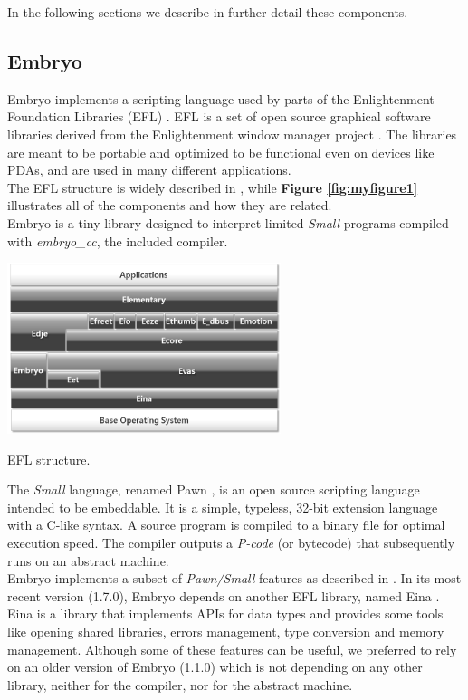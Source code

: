 \documentclass[a4paper,10pt]{article}
\makeatletter
\newenvironment{figurehere}{\def\@captype{figure}\vspace{2ex}}{\vspace{2ex}}
\makeatother
\begin{document}
\begin{multicols}{2}
In the following sections we describe in further detail these components.


\subsection{Embryo}

Embryo implements a scripting language used by parts of the Enlightenment Foundation Libraries (EFL) \cite{wikiEFL}. EFL is a set of open source graphical software libraries derived from the Enlightenment window manager project \cite{wikiEnlight}. The libraries are meant to be portable and optimized to be functional even on devices like PDAs, and are used in many different applications.\\
The EFL structure is widely described in \cite{enlightSite}, while {\bf Figure \ref{fig:myfigure1}} illustrates all of the components and how they are related.\\
Embryo \cite{embryoSite} is a tiny library designed to interpret limited \textit{Small} programs compiled with \textit{embryo\_cc}, the included compiler.

\begin{figurehere}
 \centering
 \includegraphics[width=8cm, height=5cm]{./eps/efl}
 \caption{EFL structure.}
 \label{fig:myfigure1}
\end{figurehere}

The \textit{Small} language, renamed Pawn \cite{pawnLang}, is an open source scripting language intended to be embeddable. It is a simple, typeless, 32-bit extension language with a C-like syntax. A source program is compiled to a binary file for optimal execution speed. The compiler outputs a \textit{P-code} (or bytecode) that subsequently runs on an abstract machine.\\
Embryo implements a subset of \textit{Pawn/Small} features as described in \cite{embyoLang}. In its most recent version (1.7.0), Embryo depends on another EFL library, named Eina \cite{einaLib}. Eina is a library that implements APIs for data types and provides some tools like opening shared libraries, errors management, type conversion and memory management. Although some of these features can be useful, we preferred to rely on an older version of Embryo (1.1.0) which is not depending on any other library, neither for the compiler, nor for the abstract machine.


\end{multicols}
\end{document}
